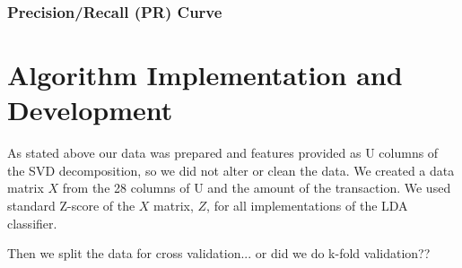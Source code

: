 \documentclass{article}
\begin{document}
\subsubsection{Precision/Recall (PR) Curve}
%
%
%
%
%

\section{Algorithm Implementation and Development}

As stated above our data was prepared and features provided as U columns of the SVD decomposition, so we did not alter or clean the data.
We created a  data matrix $X$ from the 28 columns of U and the amount of the transaction.
We used standard Z-score of the $X$ matrix, $Z$, for all implementations of the LDA classifier.

Then we split the data for cross validation... or did we do k-fold validation??
\end{document}
